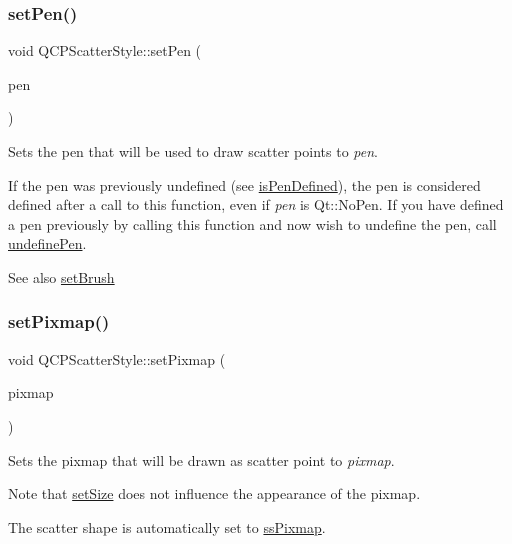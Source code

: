 \subsubsection{\texorpdfstring{set\+Pen()}{setPen()}}
{\footnotesize\ttfamily void Q\+C\+P\+Scatter\+Style\+::set\+Pen (\begin{DoxyParamCaption}\item[{const Q\+Pen \&}]{pen }\end{DoxyParamCaption})}

Sets the pen that will be used to draw scatter points to {\itshape pen}.

If the pen was previously undefined (see \mbox{\hyperlink{class_q_c_p_scatter_style_a47077eb6450fe9a788f833e4ec1b1d5a}{is\+Pen\+Defined}}), the pen is considered defined after a call to this function, even if {\itshape pen} is {\ttfamily Qt\+::\+No\+Pen}. If you have defined a pen previously by calling this function and now wish to undefine the pen, call \mbox{\hyperlink{class_q_c_p_scatter_style_acabc2a8c83d650b946f50c3166b6c35e}{undefine\+Pen}}.

\begin{DoxySeeAlso}{See also}
\mbox{\hyperlink{class_q_c_p_scatter_style_a74d692aaeb8d4b36d6f7d510e44264b1}{set\+Brush}} 
\end{DoxySeeAlso}
\mbox{\label{class_q_c_p_scatter_style_a5fb611d46acfac520d7b89a1c71d9246}} 
\subsubsection{\texorpdfstring{set\+Pixmap()}{setPixmap()}}
{\footnotesize\ttfamily void Q\+C\+P\+Scatter\+Style\+::set\+Pixmap (\begin{DoxyParamCaption}\item[{const Q\+Pixmap \&}]{pixmap }\end{DoxyParamCaption})}

Sets the pixmap that will be drawn as scatter point to {\itshape pixmap}.

Note that \mbox{\hyperlink{class_q_c_p_scatter_style_aaefdd031052892c4136129db68596e0f}{set\+Size}} does not influence the appearance of the pixmap.

The scatter shape is automatically set to \mbox{\hyperlink{class_q_c_p_scatter_style_adb31525af6b680e6f1b7472e43859349a8718b849ca7c307b07b8e091efb0c31e}{ss\+Pixmap}}. \mbox{\label{class_q_c_p_scatter_style_a7c641c4d4c6d29cb705d3887cfce91c1}} 

